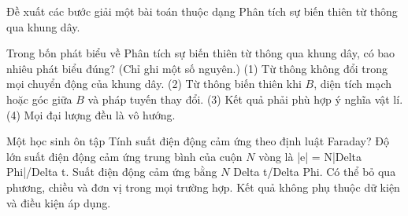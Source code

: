 \begin{bt}
Đề xuất các bước giải một bài toán thuộc dạng Phân tích sự biến thiên từ thông qua khung dây.
\end{bt}

\begin{ex}
Trong bốn phát biểu về Phân tích sự biến thiên từ thông qua khung dây, có bao nhiêu phát biểu đúng? (Chỉ ghi một số nguyên.) (1) Từ thông không đổi trong mọi chuyển động của khung dây. (2) Từ thông biến thiên khi $B$, diện tích mạch hoặc góc giữa $B$ và pháp tuyến thay đổi. (3) Kết quả phải phù hợp ý nghĩa vật lí. (4) Mọi đại lượng đều là vô hướng.
\end{ex}

\begin{ex}
Một học sinh ôn tập Tính suất điện động cảm ứng theo định luật Faraday?
\choice
{\True Độ lớn suất điện động cảm ứng trung bình của cuộn $N$ vòng là |e| = N|Delta Phi|/Delta t.}
{Suất điện động cảm ứng bằng $N$ Delta t/Delta Phi.}
{Có thể bỏ qua phương, chiều và đơn vị trong mọi trường hợp.}
{Kết quả không phụ thuộc dữ kiện và điều kiện áp dụng.}
\end{ex}

